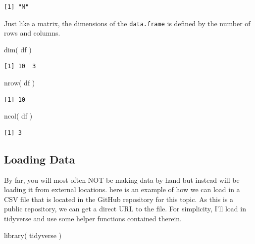 \documentclass[
  letterpaper,
]{book}
\newenvironment{Shaded}{\begin{snugshade}}{\end{snugshade}}
\newcommand{\FunctionTok}[1]{\textcolor[rgb]{0.28,0.35,0.67}{#1}}
\newcommand{\NormalTok}[1]{\textcolor[rgb]{0.00,0.23,0.31}{#1}}
\begin{document}
\begin{verbatim}
[1] "M"
\end{verbatim}

Just like a matrix, the dimensions of the \texttt{data.frame} is defined
by the number of rows and columns.

\begin{Shaded}
\begin{Highlighting}[]
\FunctionTok{dim}\NormalTok{( df )}
\end{Highlighting}
\end{Shaded}

\begin{verbatim}
[1] 10  3
\end{verbatim}

\begin{Shaded}
\begin{Highlighting}[]
\FunctionTok{nrow}\NormalTok{( df )}
\end{Highlighting}
\end{Shaded}

\begin{verbatim}
[1] 10
\end{verbatim}

\begin{Shaded}
\begin{Highlighting}[]
\FunctionTok{ncol}\NormalTok{( df )}
\end{Highlighting}
\end{Shaded}

\begin{verbatim}
[1] 3
\end{verbatim}

\subsection{Loading Data}\label{loading-data}

By far, you will most often NOT be making data by hand but instead will
be loading it from external locations. here is an example of how we can
load in a CSV file that is located in the GitHub repository for this
topic. As this is a public repository, we can get a direct URL to the
file. For simplicity, I'll load in tidyverse and use some helper
functions contained therein.

\begin{Shaded}
\begin{Highlighting}[]
\FunctionTok{library}\NormalTok{( tidyverse )}
\end{Highlighting}
\end{Shaded}
\end{document}
